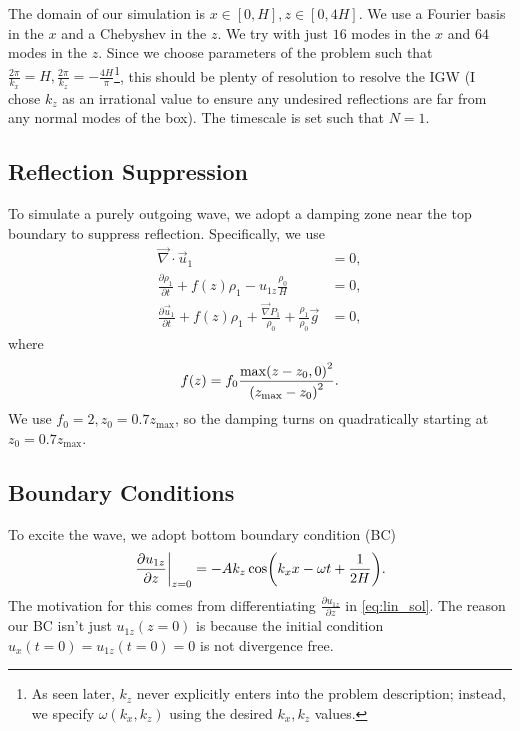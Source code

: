 \documentclass[11pt,
        usenames, %
        dvipsnames %
    ]{article}
\newcommand*{\pd}[2]{\frac{\partial#1}{\partial#2}}
\newcommand*{\at}[1]{\left.#1\right|}
\DeclarePairedDelimiter\p{\lparen}{\rparen}
\begin{document}
The domain of our simulation is $x \in [0, H], z \in [0, 4H]$. We use a Fourier
basis in the $x$ and a Chebyshev in the $z$. We try with just $16$ modes in the
$x$ and $64$ modes in the $z$. Since we choose parameters of the problem such
that $\frac{2\pi}{k_x} = H, \frac{2\pi}{k_z} = -\frac{4H}{\pi}$\footnote{As
seen later, $k_z$ never explicitly enters into the problem description; instead,
we specify $\omega(k_x, k_z)$ using the desired $k_x, k_z$ values.}, this should
be plenty of resolution to resolve the IGW (I chose $k_z$ as an irrational value
to ensure any undesired reflections are far from any normal modes of the box).
The timescale is set such that $N = 1$.

\subsection{Reflection Suppression}

To simulate a purely outgoing wave, we adopt a damping zone near the top
boundary to suppress reflection. Specifically, we use
\begin{subequations}\label{eq:lin_feq_sponge}
    \begin{align}
        \vec{\nabla} \cdot \vec{u}_1 &= 0,\\
        \pd{\rho_1}{t} + f(z)\rho_1 - u_{1z}\frac{\rho_0}{H} &= 0,\\
        \pd{\vec{u}_1}{t} + f(z)\rho_1 + \frac{\vec{\nabla}P_1}{\rho_0}
            + \frac{\rho_1}{\rho_0}\vec{g} &= 0,
    \end{align}
\end{subequations}
where
\begin{equation}
    f(z) = f_0 \frac{\max\p*{z - z_0, 0}^2}{\p*{z_{\max} - z_0}^2}.
\end{equation}
We use $f_0 = 2, z_0 = 0.7 z_{\max}$, so the damping turns on quadratically
starting at $z_0 = 0.7z_{\max}$.

\subsection{Boundary Conditions}

To excite the wave, we adopt bottom boundary condition (BC)
\begin{equation}
    \at{\pd{u_{1z}}{z}}_{z = 0} = -Ak_z\cos\p*{k_xx - \omega t + \frac{1}{2H}}.
\end{equation}
The motivation for this comes from differentiating $\pd{u_{1z}}{z}$ in
\autoref{eq:lin_sol}. The reason our BC isn't just $u_{1z}(z = 0)$ is because the
initial condition $u_x(t = 0) = u_{1z}(t = 0) = 0$ is not divergence free.
\end{document}
